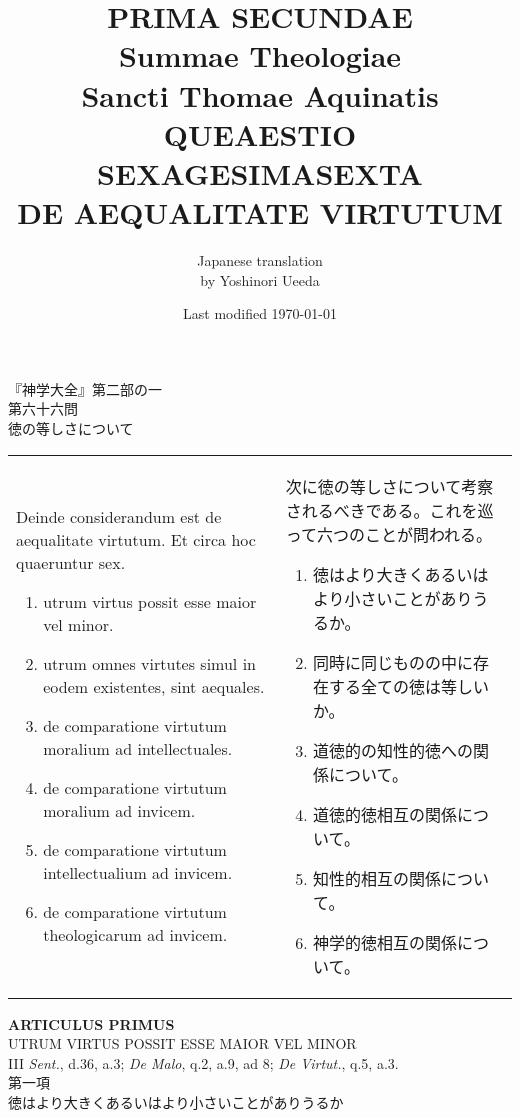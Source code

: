 \documentclass[10pt]{jsarticle}
\title{{\bf PRIMA SECUNDAE}\\{\HUGE Summae Theologiae}\\Sancti Thomae
Aquinatis\\{\sffamily QUEAESTIO SEXAGESIMASEXTA}\\DE AEQUALITATE VIRTUTUM}
\author{Japanese translation\\by Yoshinori {\sc Ueeda}}
\date{Last modified \today}
\begin{document}
\maketitle
\thispagestyle{empty}

\begin{center}
{\LARGE 『神学大全』第二部の一}\\
{\Large 第六十六問\\徳の等しさについて}
\end{center}

\begin{longtable}{p{21em}p{21em}}

Deinde considerandum est de aequalitate virtutum. Et circa hoc
quaeruntur sex. 

\begin{enumerate}
 \item utrum virtus possit esse maior vel minor.
 \item utrum omnes virtutes simul in eodem existentes, sint aequales.
 \item de comparatione virtutum moralium ad intellectuales.
 \item de comparatione virtutum moralium ad invicem.
 \item de comparatione virtutum intellectualium ad invicem.
 \item de comparatione virtutum theologicarum ad invicem.
\end{enumerate}

&

次に徳の等しさについて考察されるべきである。これを巡って六つのことが問われる。

\begin{enumerate}
 \item 徳はより大きくあるいはより小さいことがありうるか。
 \item 同時に同じものの中に存在する全ての徳は等しいか。
 \item 道徳的の知性的徳への関係について。
 \item 道徳的徳相互の関係について。
 \item 知性的相互の関係について。
 \item 神学的徳相互の関係について。
\end{enumerate}
\end{longtable}

\newpage

\begin{center}
{\Large {\bf ARTICULUS PRIMUS}}\\
{\large UTRUM VIRTUS POSSIT ESSE MAIOR VEL MINOR}\\
{\footnotesize III {\itshape Sent.}, d.36, a.3; {\itshape De Malo}, q.2, a.9, ad 8; {\itshape De Virtut.}, q.5, a.3.}\\
{\Large 第一項\\徳はより大きくあるいはより小さいことがありうるか}
\end{center}
\end{document}

